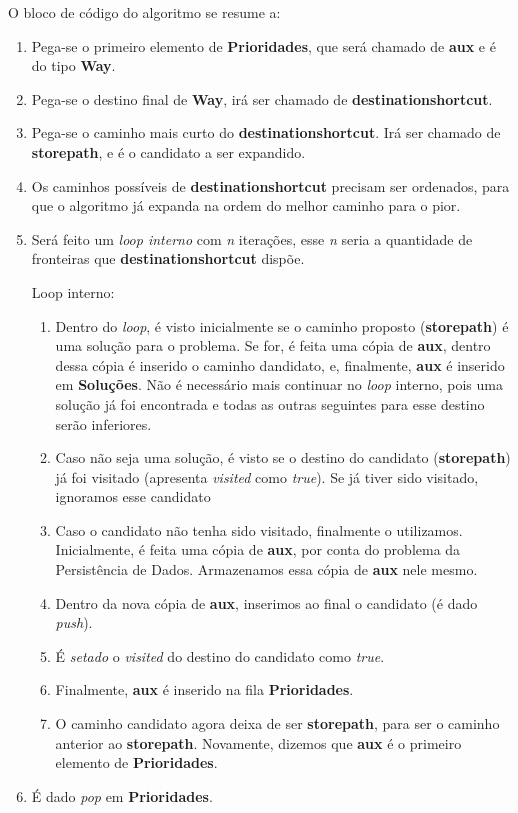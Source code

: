 O bloco de código do algoritmo se resume a:
\begin{enumerate}
\item Pega-se o primeiro elemento de \textbf{Prioridades}, que será chamado de \textbf{aux} e é do tipo \textbf{Way}.
\item Pega-se o destino final de \textbf{Way}, irá ser chamado de \textbf{destination\textunderscore shortcut}.
\item Pega-se o caminho mais curto do \textbf{destination\textunderscore shortcut}. Irá ser chamado de \textbf{store\textunderscore path}, e é o candidato a ser expandido.
\item Os caminhos possíveis de \textbf{destination\textunderscore shortcut} precisam ser ordenados, para que o algoritmo já expanda na ordem do melhor caminho para o pior.
\item Será feito um \textit{loop interno} com \textit{n} iterações, esse \textit{n} seria a quantidade de fronteiras que \textbf{destination\textunderscore shortcut} dispõe.

  Loop interno:
  \begin{enumerate}
    \item Dentro do \textit{loop}, é visto inicialmente se o caminho proposto (\textbf{store\textunderscore path}) é uma solução para o problema. Se for, é feita uma cópia de \textbf{aux}, dentro dessa cópia é inserido o caminho dandidato, e, finalmente, \textbf{aux} é inserido em \textbf{Soluções}. Não é necessário mais continuar no \textit{loop} interno, pois uma solução já foi encontrada e todas as outras seguintes para esse destino serão inferiores.
    \item Caso não seja uma solução, é visto se o destino do candidato (\textbf{store\textunderscore path}) já foi visitado (apresenta \textit{visited} como \textit{true}). Se já tiver sido visitado, ignoramos esse candidato
    \item Caso o candidato não tenha sido visitado, finalmente o utilizamos. Inicialmente, é feita uma cópia de \textbf{aux}, por conta do problema da Persistência de Dados. Armazenamos essa cópia de \textbf{aux} nele mesmo.
    \item Dentro da nova cópia de \textbf{aux}, inserimos ao final o candidato (é dado \textit{push}).
    \item É \textit{setado} o \textit{visited} do destino do candidato como \textit{true}.
    \item Finalmente, \textbf{aux} é inserido na fila \textbf{Prioridades}.
    \item O caminho candidato agora deixa de ser \textbf{store\textunderscore path}, para ser o caminho anterior ao \textbf{store\textunderscore path}. Novamente, dizemos que \textbf{aux} é o primeiro elemento de \textbf{Prioridades}.
  \end{enumerate}

\item É dado \textit{pop} em \textbf{Prioridades}.
\end{enumerate}


